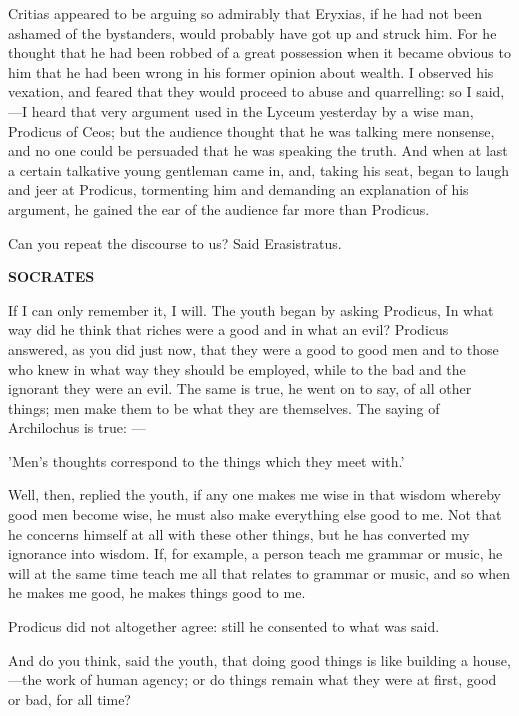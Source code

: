 \documentclass[11pt,letter]{article}
\begin{document}
\par  Critias appeared to be arguing so admirably that Eryxias, if he had not been ashamed of the bystanders, would probably have got up and struck him. For he thought that he had been robbed of a great possession when it became obvious to him that he had been wrong in his former opinion about wealth. I observed his vexation, and feared that they would proceed to abuse and quarrelling: so I said,—I heard that very argument used in the Lyceum yesterday by a wise man, Prodicus of Ceos; but the audience thought that he was talking mere nonsense, and no one could be persuaded that he was speaking the truth. And when at last a certain talkative young gentleman came in, and, taking his seat, began to laugh and jeer at Prodicus, tormenting him and demanding an explanation of his argument, he gained the ear of the audience far more than Prodicus.

\par  Can you repeat the discourse to us? Said Erasistratus.

\par \textbf{SOCRATES}
\par   If I can only remember it, I will. The youth began by asking Prodicus, In what way did he think that riches were a good and in what an evil? Prodicus answered, as you did just now, that they were a good to good men and to those who knew in what way they should be employed, while to the bad and the ignorant they were an evil. The same is true, he went on to say, of all other things; men make them to be what they are themselves. The saying of Archilochus is true: —

\par  'Men's thoughts correspond to the things which they meet with.'

\par  Well, then, replied the youth, if any one makes me wise in that wisdom whereby good men become wise, he must also make everything else good to me. Not that he concerns himself at all with these other things, but he has converted my ignorance into wisdom. If, for example, a person teach me grammar or music, he will at the same time teach me all that relates to grammar or music, and so when he makes me good, he makes things good to me.

\par  Prodicus did not altogether agree: still he consented to what was said.

\par  And do you think, said the youth, that doing good things is like building a house,—the work of human agency; or do things remain what they were at first, good or bad, for all time?
\end{document}

